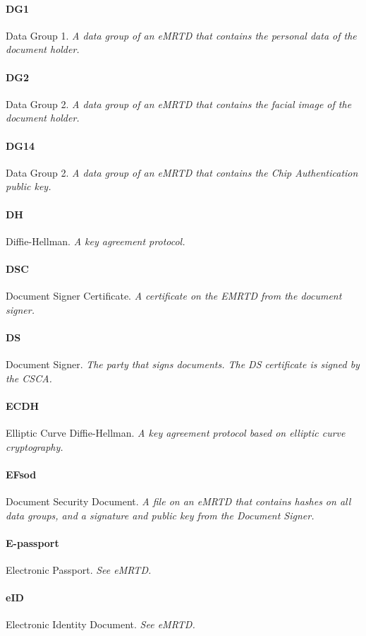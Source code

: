 \paragraph{DG1} Data Group 1. \textit{A data group of an eMRTD that contains the personal data of the document holder.}
\paragraph{DG2} Data Group 2. \textit{A data group of an eMRTD that contains the facial image of the document holder.}
\paragraph{DG14} Data Group 2. \textit{A data group of an eMRTD that contains the Chip Authentication public key.}
\paragraph{DH} Diffie-Hellman. \textit{A key agreement protocol.}
\paragraph{DSC} Document Signer Certificate. \textit{A certificate on the EMRTD from the document signer.}
\paragraph{DS} Document Signer. \textit{The party that signs documents. The DS certificate is signed by the CSCA.}
\paragraph{ECDH} Elliptic Curve Diffie-Hellman. \textit{A key agreement protocol based on elliptic curve cryptography.}
\paragraph{EFsod} Document Security Document. \textit{A file on an eMRTD that contains hashes on all data groups, and a signature and public key from the Document Signer.}
\paragraph{E-passport} Electronic Passport. \textit{See eMRTD.}
\paragraph{eID} Electronic Identity Document. \textit{See eMRTD.}
